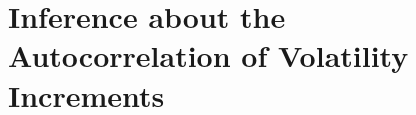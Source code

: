 \documentclass[ecta,nameyear,draft]{econsocart}
\newcommand{\1}{\mathbf 1}
\numberwithin{equation}{section}
\begin{document}
%
%
%
%
%
%
%
%
%
%











\section{Inference about the Autocorrelation of Volatility Increments}
\label{sec:CLT}
\end{document}
